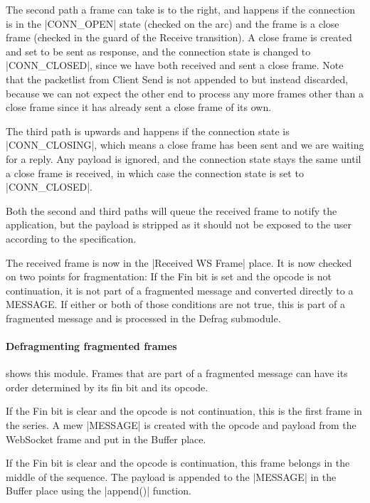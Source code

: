 		The second path a frame can take is to the right, and happens if the
		connection is in the |CONN_OPEN| state (checked on the arc) and the
		frame is a close frame (checked in the guard of the Receive transition). A
		close frame is created and set to be sent as response, and the
		connection state is changed to |CONN_CLOSED|, since we have both
		received and sent a close frame. Note that the packetlist from Client Send is
		not appended to but instead discarded, because we can not expect the other
		end to process any more frames other than a close frame since it has already
		sent a close frame of its own.
		
		The third path is upwards and happens if the connection state is
		|CONN_CLOSING|, which means a close frame has been sent and we are
		waiting for a reply. Any payload is ignored, and the connection state stays
		the same until a close frame is received, in which case the connection state
		is set to |CONN_CLOSED|. 
		
		Both the second and third paths will queue the received frame to notify the
		application, but the payload is stripped as it should not be exposed to the
		user according to the specification.
		
		The received frame is now in the |Received WS Frame| place. It is now checked
		on two points for fragmentation:
		If the Fin bit is set and the opcode is not continuation, it is not part of a fragmented
		message and converted directly to a MESSAGE. If either or both of those
		conditions are not true, this is part of a fragmented message and is processed
		in the Defrag submodule.
		
		\paragraph{Defragmenting fragmented frames}
			
			
			 shows this module. Frames that are part of a fragmented
			message can have its order determined by its fin bit and its opcode.
			
			If the Fin bit is clear and the opcode is not continuation, this is the first
			frame in the series. A mew |MESSAGE| is created with the opcode and
			payload from the WebSocket frame and put in the Buffer place.
			
			If the Fin bit is clear and the opcode is continuation, this frame belongs in
			the middle of the sequence. The payload is appended to the
			|MESSAGE| in the Buffer place using the |append()|
			function.
			
